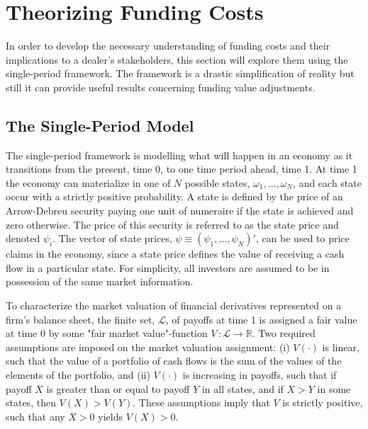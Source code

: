 \documentclass[main.tex]{subfiles}
\begin{document}
    \section{Theorizing Funding Costs}
    \label{sec:single-period-model}
        In order to develop the necessary understanding of funding costs 
        and their implications to a dealer's stakeholders, 
        this section will explore them using the single-period framework.
        The framework is a drastic simplification of reality but still it can provide useful results concerning funding value adjustments.

    \subsection{The Single-Period Model}
        The single-period framework is modelling what will happen in an economy as it transitions from the present, time 0, to one time period ahead, time 1.
        At time 1 the economy can materialize in one of $N$ possible states, $\omega_{1}, \dots, \omega_{N}$, and each state occur with a strictly positive probability.
        A state is defined by the price of an Arrow-Debreu security paying one unit of numeraire if the state is achieved and zero otherwise.
        The price of this security is referred to as the state price and denoted $\psi_{i}$.
        The vector of state prices, $\psi \equiv \left(\psi_{1}, \dots, \psi_{N}\right)'$, can be used to price claims in the economy, since a state price defines the value of receiving a cash flow in a particular state.
        For simplicity, all investors are assumed to be in possession of the same market information.

        To characterize the market valuation of financial derivatives represented on a firm's balance sheet, the finite set, $\mathcal{L}$, of payoffs at time 1 is assigned a fair value at time 0 by some "fair market value"-function $V\, \colon \mathcal{L} \rightarrow \mathbb{R}$.
        Two required assumptions are imposed on the market valuation assignment: 
        (i) $V(\cdot)$ is linear, such that the value of a portfolio of cash flows is the sum of the values of the elements of the portfolio, and 
        (ii) $V(\cdot)$ is increasing in payoffs, such that if payoff $X$ is greater than or equal to payoff $Y$ in all states, and if $X>Y$ in some states, then $V(X)>V(Y)$.
        These assumptions imply that $V$ is strictly positive, such that any $X>0$ yields $V(X) > 0$.
        
\end{document}
